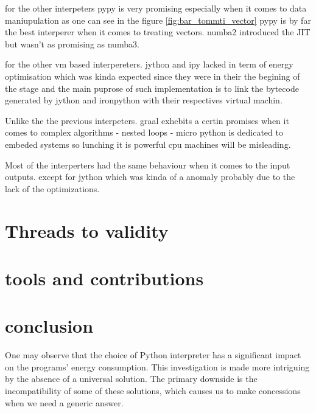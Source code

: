 for the other interpeters pypy is very promising especially when it comes to data maniupulation as one can see in the figure \ref{fig:bar_tommti_vector}
pypy is by far the best interperer when it comes to treating vectors.
numba2 introduced the JIT but wasn't as promising as numba3.

for the other vm based interpereters. jython and ipy lacked in term of energy optimisation which was kinda expected since they were in their the begining of the stage and the main puprose of such implementation is to link the bytecode generated by jython and ironpython with their respectives virtual machin.

Unlike the the previous interpeters. graal exhebits a certin promises when it comes to complex algorithms - nested loops -
micro python is dedicated to embeded systems so lunching it is powerful cpu machines will be misleading.

Most of the interperters had the same behaviour when it comes to the input outputs. except for jython which was kinda of a anomaly probably due to the lack of the optimizations.

\section{Threads to validity}
\section{tools and contributions}



\section{conclusion}
One may observe that the choice of Python interpreter has a significant impact on the programs' energy consumption.
This investigation is made more intriguing by the absence of a universal solution.
The primary downside is the incompatibility of some of these solutions, which causes us to make concessions when we need a generic answer. 